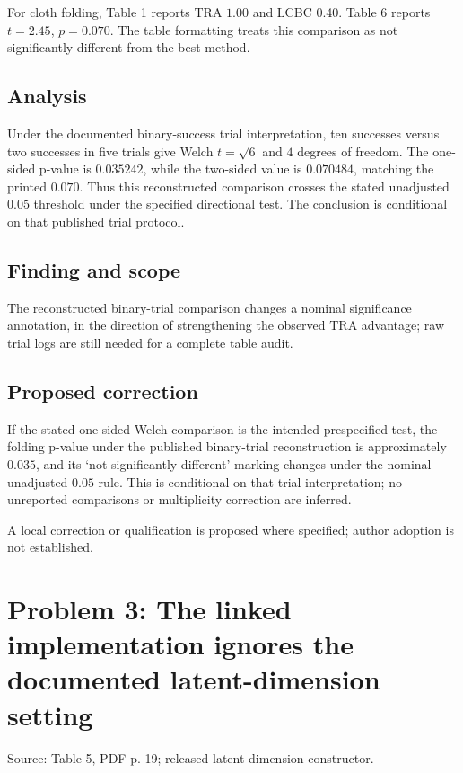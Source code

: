\documentclass[11pt]{article}
\begin{document}
For cloth folding, Table 1 reports TRA \(1.00\) and LCBC 0.40. Table 6 reports \(t=2.45\), \(p=0.070\). The table formatting treats this comparison as not significantly different from the best method.

\subsection*{Analysis}

Under the documented binary-success trial interpretation, ten successes versus two successes in five trials give Welch \(t=\sqrt6\) and \(4\) degrees of freedom. The one-sided p-value is \(0.035242\), while the two-sided value is \(0.070484\), matching the printed \(0.070\). Thus this reconstructed comparison crosses the stated unadjusted \(0.05\) threshold under the specified directional test. The conclusion is conditional on that published trial protocol.

\subsection*{Finding and scope}

The reconstructed binary-trial comparison changes a nominal significance annotation, in the direction of strengthening the observed TRA advantage; raw trial logs are still needed for a complete table audit.

\subsection*{Proposed correction}

If the stated one-sided Welch comparison is the intended prespecified test, the folding p-value under the published binary-trial reconstruction is approximately \(0.035\), and its ‘not significantly different’ marking changes under the nominal unadjusted \(0.05\) rule. This is conditional on that trial interpretation; no unreported comparisons or multiplicity correction are inferred.

A local correction or qualification is proposed where specified; author adoption is not established.

\section*{Problem 3: The linked implementation ignores the documented latent-dimension setting}

Source: Table 5, PDF p. 19; released latent-dimension constructor.
\end{document}
